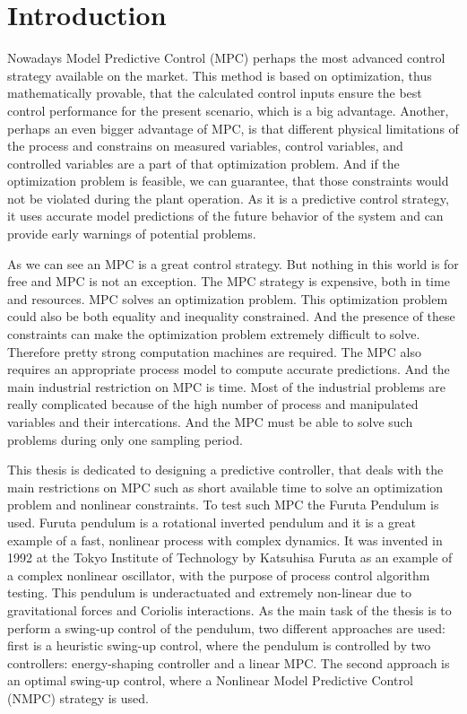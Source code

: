 \chapter{Introduction}
\label{ch:intro}
Nowadays Model Predictive Control (MPC) perhaps the most advanced control strategy available on the market. This method is based on optimization, thus mathematically provable, that  the calculated control inputs ensure the best control performance for the present scenario, which is a big advantage. Another, perhaps an even bigger advantage of MPC, is that different physical limitations of the process and constrains on measured variables, control variables, and controlled variables are a part of that optimization problem. And if the optimization problem is feasible, we can guarantee, that those constraints would not be violated during the plant operation. As it is a predictive control strategy, it uses accurate model predictions of the future behavior of the system and can provide early warnings of potential problems.

As we can see an MPC is a great control strategy. But nothing in this world is for free and MPC is not an exception. The MPC strategy is expensive, both in time and resources. MPC solves an optimization problem. This optimization problem could also be both equality and inequality constrained. And the presence of these constraints can make the optimization problem extremely difficult to solve. Therefore pretty strong computation machines are required. The MPC also requires an appropriate process model to compute accurate predictions. And the main industrial restriction on MPC is time. Most of the industrial problems are really complicated because of the high number of process and manipulated variables and their intercations. And the MPC must be able to solve such problems during only one sampling period.

This thesis is dedicated to designing a predictive controller, that deals with the main restrictions on MPC such as short available time to solve an optimization problem and nonlinear constraints. To test such MPC the Furuta Pendulum is used. Furuta pendulum is a rotational inverted pendulum and it is a great example of a fast, nonlinear process with complex dynamics. It was invented in 1992 at the Tokyo Institute of Technology by Katsuhisa Furuta as an example of a complex nonlinear oscillator, with the purpose of process control algorithm testing. This pendulum is underactuated and extremely non-linear due to gravitational forces and Coriolis interactions. As the main task of the thesis is to perform a swing-up control of the pendulum, two different approaches are used: first is a heuristic swing-up control, where the pendulum is controlled by two controllers: energy-shaping controller and a linear MPC. The second approach is an optimal swing-up control, where a Nonlinear Model Predictive Control (NMPC) strategy is used.


